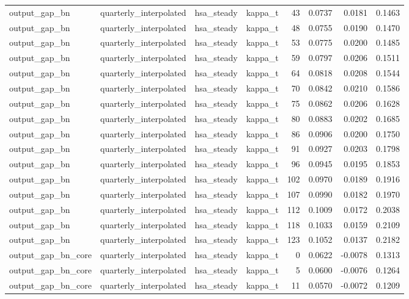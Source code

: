 \begin{tabular}{llllrrrr}
output\_gap\_bn & quarterly\_interpolated & hsa\_steady & kappa\_t & 43 & 0.0737 & 0.0181 & 0.1463 \\
output\_gap\_bn & quarterly\_interpolated & hsa\_steady & kappa\_t & 48 & 0.0755 & 0.0190 & 0.1470 \\
output\_gap\_bn & quarterly\_interpolated & hsa\_steady & kappa\_t & 53 & 0.0775 & 0.0200 & 0.1485 \\
output\_gap\_bn & quarterly\_interpolated & hsa\_steady & kappa\_t & 59 & 0.0797 & 0.0206 & 0.1511 \\
output\_gap\_bn & quarterly\_interpolated & hsa\_steady & kappa\_t & 64 & 0.0818 & 0.0208 & 0.1544 \\
output\_gap\_bn & quarterly\_interpolated & hsa\_steady & kappa\_t & 70 & 0.0842 & 0.0210 & 0.1586 \\
output\_gap\_bn & quarterly\_interpolated & hsa\_steady & kappa\_t & 75 & 0.0862 & 0.0206 & 0.1628 \\
output\_gap\_bn & quarterly\_interpolated & hsa\_steady & kappa\_t & 80 & 0.0883 & 0.0202 & 0.1685 \\
output\_gap\_bn & quarterly\_interpolated & hsa\_steady & kappa\_t & 86 & 0.0906 & 0.0200 & 0.1750 \\
output\_gap\_bn & quarterly\_interpolated & hsa\_steady & kappa\_t & 91 & 0.0927 & 0.0203 & 0.1798 \\
output\_gap\_bn & quarterly\_interpolated & hsa\_steady & kappa\_t & 96 & 0.0945 & 0.0195 & 0.1853 \\
output\_gap\_bn & quarterly\_interpolated & hsa\_steady & kappa\_t & 102 & 0.0970 & 0.0189 & 0.1916 \\
output\_gap\_bn & quarterly\_interpolated & hsa\_steady & kappa\_t & 107 & 0.0990 & 0.0182 & 0.1970 \\
output\_gap\_bn & quarterly\_interpolated & hsa\_steady & kappa\_t & 112 & 0.1009 & 0.0172 & 0.2038 \\
output\_gap\_bn & quarterly\_interpolated & hsa\_steady & kappa\_t & 118 & 0.1033 & 0.0159 & 0.2109 \\
output\_gap\_bn & quarterly\_interpolated & hsa\_steady & kappa\_t & 123 & 0.1052 & 0.0137 & 0.2182 \\
output\_gap\_bn\_core & quarterly\_interpolated & hsa\_steady & kappa\_t & 0 & 0.0622 & -0.0078 & 0.1313 \\
output\_gap\_bn\_core & quarterly\_interpolated & hsa\_steady & kappa\_t & 5 & 0.0600 & -0.0076 & 0.1264 \\
output\_gap\_bn\_core & quarterly\_interpolated & hsa\_steady & kappa\_t & 11 & 0.0570 & -0.0072 & 0.1209 \\

\end{tabular}
